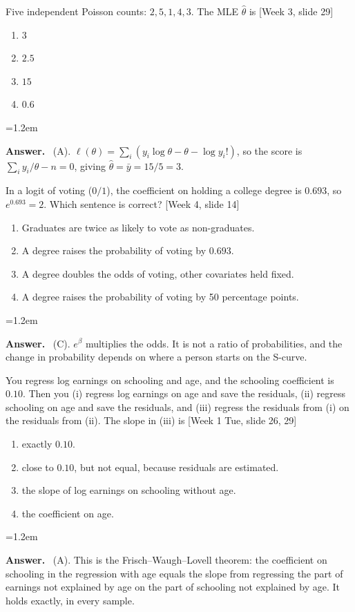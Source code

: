 \documentclass[11pt]{article}
\newenvironment{answer}{\par\smallskip
  \begin{list}{}{\leftmargin=1.2em\rightmargin=0pt}\item[]\color{dukeblue}%
  \textbf{Answer.}\ }{\end{list}\smallskip}
\newcommand{\slideref}[2]{{\footnotesize\color{gray}[Week #1, slide #2]}}
\begin{document}
\begin{enumerate}[leftmargin=*,itemsep=8pt]
\item Five independent Poisson counts: $2, 5, 1, 4, 3$. The MLE $\hat\theta$ is
      \slideref{3}{29}
      \begin{enumerate}[label=(\Alph*),itemsep=0pt]
      \item $3$
      \item $2.5$
      \item $15$
      \item $0.6$
      \end{enumerate}
\begin{answer}
(A). $\ell(\theta) = \sum_i (y_i\log\theta - \theta - \log y_i!)$, so the score is
$\sum_i y_i/\theta - n = 0$, giving $\hat\theta = \bar y = 15/5 = 3$.
\end{answer}

\item In a logit of voting ($0/1$), the coefficient on holding a college degree is $0.693$,
      so $e^{0.693} = 2$. Which sentence is correct? \slideref{4}{14}
      \begin{enumerate}[label=(\Alph*),itemsep=0pt]
      \item Graduates are twice as likely to vote as non-graduates.
      \item A degree raises the probability of voting by $0.693$.
      \item A degree doubles the odds of voting, other covariates held fixed.
      \item A degree raises the probability of voting by 50 percentage points.
      \end{enumerate}
\begin{answer}
(C). $e^{\beta}$ multiplies the odds. It is not a ratio of probabilities, and the change in
probability depends on where a person starts on the S-curve.
\end{answer}

\item You regress log earnings on schooling and age, and the schooling coefficient is
      $0.10$. Then you (i) regress log earnings on age and save the residuals,
      (ii) regress schooling on age and save the residuals, and (iii) regress the
      residuals from (i) on the residuals from (ii). The slope in (iii) is
      \slideref{1 Tue}{26, 29}
      \begin{enumerate}[label=(\Alph*),itemsep=0pt]
      \item exactly $0.10$.
      \item close to $0.10$, but not equal, because residuals are estimated.
      \item the slope of log earnings on schooling without age.
      \item the coefficient on age.
      \end{enumerate}
\begin{answer}
(A). This is the Frisch--Waugh--Lovell theorem: the coefficient on schooling in the
regression with age equals the slope from regressing the part of earnings not explained by
age on the part of schooling not explained by age. It holds exactly, in every sample.
\end{answer}


\end{enumerate}
\end{document}
